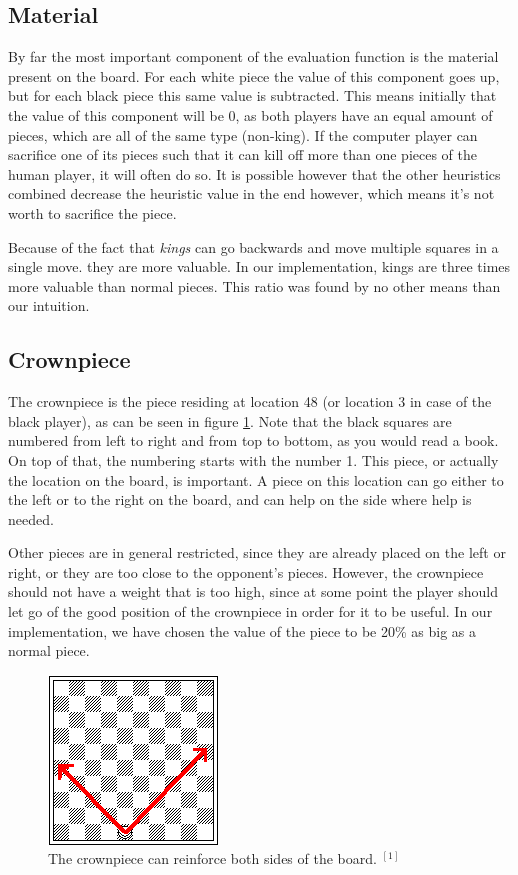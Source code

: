 \documentclass[10pt,a4paper]{article}
\begin{document}
\subsection{Material}
By far the most important component of the evaluation function is the material present on the board. For each white piece the value of this component goes up, but for each black piece this same value is subtracted. This means initially that the value of this component will be 0, as both players have an equal amount of pieces, which are all of the same type (non-king). If the computer player can sacrifice one of its pieces such that it can kill off more than one pieces of the human player, it will often do so. It is possible however that the other heuristics combined decrease the heuristic value in the end however, which means it's not worth to sacrifice the piece.

Because of the fact that \emph{kings} can go backwards and move multiple squares in a single move. they are more valuable. In our implementation, kings are three times more valuable than normal pieces. This ratio was found by no other means than our intuition.

\subsection{Crownpiece}
The crownpiece is the piece residing at location 48 (or location 3 in case of the black player), as can be seen in figure \ref{crownPiece}. Note that the black squares are numbered from left to right and from top to bottom, as you would read a book. On top of that, the numbering starts with the number 1. This piece, or actually the location on the board, is important. A piece on this location can go either to the left or to the right on the board, and can help on the side where help is needed.

Other pieces are in general restricted, since they are already placed on the left or right, or they are too close to the opponent's pieces. However, the crownpiece should not have a weight that is too high, since at some point the player should let go of the good position of the crownpiece in order for it to be useful. In our implementation, we have chosen the value of the piece to be 20\% as big as a normal piece.

\begin{figure}[h!]
	\begin{center}
	\includegraphics{./images/crownPiece.png}
	\caption{The crownpiece can reinforce both sides of the board. $^{[1]}$}
	\label{crownPiece}
	\end{center}
\end{figure}
\end{document}
